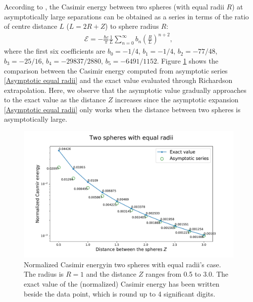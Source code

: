 According to \cite{emig2008casimir}, the Casimir energy between two spheres (with equal radii $R$) at asymptotically 
large separations can be obtained as a series in terms of the ratio of centre distance $L$ ($L = 2R + Z$) to sphere radius $R$:
\begin{align}\label{Asymptotic equal radii}
   \mathcal{E} = -\frac{\hbar c}{\pi}\frac{1}{L}\sum_{n=0}^{\infty}b_{n}\left(\frac{R}{L}\right)^{n+2},
\end{align}
where the first six coefficients are 
$b_{0} = -1/4$, $b_{1} = -1/4$,  $b_{2} = -77/48$,  $b_{3} = -25/16$,  $b_{4} = -29837/2880$, $b_{5} = -6491/1152$. Figure 
\ref{Casimir energy between spheres with equal radii} shows the comparison between the Casimir energy computed from asymptotic series 
\eqref{Asymptotic equal radii} and the exact value evaluated through {Richardson extrapolation}. Here, we observe that the asymptotic value gradually 
approaches to the exact value as the distance $Z$ increases since the asymptotic expansion \eqref{Asymptotic equal radii} only works when the distance 
between two spheres is asymptotically large.

\begin{figure}[H]
    \includegraphics[scale = 0.7]{figures/Spheres_equal_CasE.pdf}
    \caption[Caption for LOF]{Normalized Casimir energy\protect\footnotemark in two spheres with equal radii's case. The radius is $R = 1$ and the distance $Z$ 
    ranges from 0.5 to 3.0. The exact value of the (normalized) Casimir energy has been written beside the data point, which is round up to 4 significant digits.}
    \label{Casimir energy between spheres with equal radii}
\end{figure}


